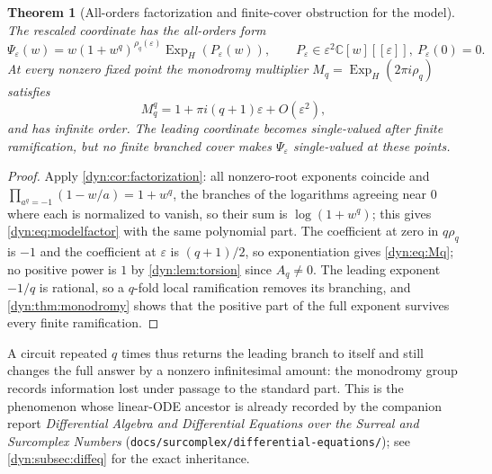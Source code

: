 \documentclass[11pt,letterpaper]{article}
\newtheorem{theorem}{Theorem}[section]
\theoremstyle{definition}
\theoremstyle{remark}
\newcommand{\C}{\mathbb C}
\newcommand{\ExpH}{\operatorname{Exp}_{\!H}}
\newcommand{\eps}{\varepsilon}
\numberwithin{equation}{section}
\begin{document}
\begin{theorem}[All-orders factorization and finite-cover obstruction for
the model]\label{dyn:thm:modelfactor}
The rescaled coordinate has the all-orders form
\begin{equation}\label{dyn:eq:modelfactor}
 \Psi_\eps(w)=w(1+w^{q})^{\rho_q(\eps)}\ExpH(P_\eps(w)),
 \qquad P_\eps\in\eps^{2}\C[w][[\eps]],\ P_\eps(0)=0 .
\end{equation}
At every nonzero fixed point the monodromy multiplier
$M_q=\ExpH(2\pi i\rho_q)$ satisfies
\begin{equation}\label{dyn:eq:Mq}
 M_q^{q}=1+\pi i(q+1)\eps+O(\eps^{2}),
\end{equation}
and has infinite order. The leading coordinate becomes single-valued after
finite ramification, but no finite branched cover makes $\Psi_\eps$
single-valued at these points.
\end{theorem}
\begin{proof}
Apply \cref{dyn:cor:factorization}: all nonzero-root exponents coincide and
$\prod_{a^{q}=-1}(1-w/a)=1+w^{q}$, the branches of the logarithms agreeing
near $0$ where each is normalized to vanish, so their sum is
$\log(1+w^{q})$; this gives \eqref{dyn:eq:modelfactor} with the same
polynomial part. The coefficient at zero in $q\rho_q$ is $-1$ and the
coefficient at $\eps$ is $(q+1)/2$, so exponentiation gives
\eqref{dyn:eq:Mq}; no positive power is $1$ by \cref{dyn:lem:torsion} since
$A_q\ne0$. The leading exponent $-1/q$ is rational, so a $q$-fold local
ramification removes its branching, and \cref{dyn:thm:monodromy} shows that
the positive part of the full exponent survives every finite ramification.
\end{proof}

A circuit repeated $q$ times thus returns the leading branch to itself and
still changes the full answer by a nonzero infinitesimal amount: the
monodromy group records information lost under passage to the standard
part. This is the phenomenon whose linear-ODE ancestor is already recorded
by the companion report \emph{Differential Algebra and Differential
Equations over the Surreal and Surcomplex Numbers}
(\texttt{docs/surcomplex/differential-equations/}); see
\cref{dyn:subsec:diffeq} for the exact inheritance.
\end{document}
